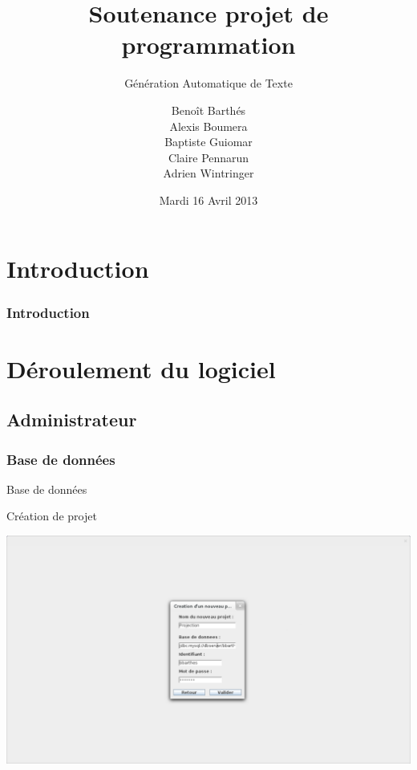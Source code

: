 \documentclass[8pt]{beamer}
\title{Soutenance projet de programmation}
\subtitle{Génération Automatique de Texte}
\author{Benoît Barthés \\ Alexis Boumera \\ Baptiste Guiomar \\ Claire Pennarun \\ Adrien Wintringer}
\date{Mardi 16 Avril 2013}
\begin{document}
 
\begin{frame}
\titlepage
\end{frame}

\section*{Introduction}
\begin{frame}\frametitle{Introduction}
\end{frame}


\section{Déroulement du logiciel}

\subsection{Administrateur}

\subsubsection{Base de données}
\begin{frame}{Base de données}
\begin{block}{Création de projet}
\begin{center}
\includegraphics[scale=0.2]{db_connection.png}
\end{center}
\end{block}
\end{frame}
\end{document}
